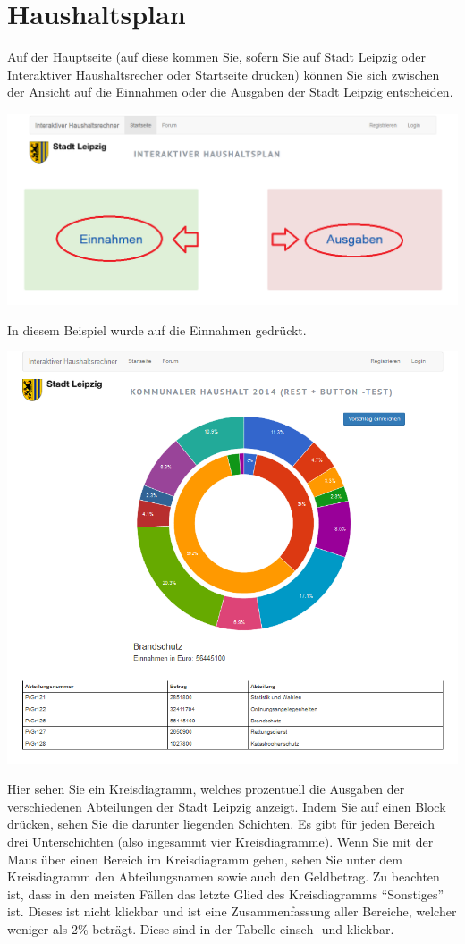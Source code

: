 \documentclass[a4paper,11pt,twoside]{article}
\begin{document}
\section{Haushaltsplan}
Auf der Hauptseite (auf diese kommen Sie, sofern Sie auf Stadt Leipzig oder
Interaktiver Haushaltsrecher oder Startseite dr\"ucken) k\"onnen Sie sich
zwischen der Ansicht auf die Einnahmen oder die Ausgaben der Stadt Leipzig
entscheiden.
\begin{center}
  \includegraphics[width=\textwidth]{Bilder/einAus.png}
\end{center}
In diesem Beispiel wurde auf die Einnahmen gedr\"uckt.

\begin{center}
  \includegraphics[width=\textwidth]{Bilder/piechart.png}
\end{center}
Hier sehen Sie ein Kreisdiagramm, welches prozentuell die Ausgaben der
verschiedenen Abteilungen der Stadt Leipzig anzeigt.  Indem Sie auf einen
Block dr\"ucken, sehen Sie die darunter liegenden Schichten. Es gibt f\"ur
jeden Bereich drei Unterschichten (also ingesammt vier Kreisdiagramme). Wenn
Sie mit der Maus \"uber einen Bereich im Kreisdiagramm gehen, sehen Sie unter
dem Kreisdiagramm den Abteilungsnamen sowie auch den Geldbetrag. Zu beachten
ist, dass in den meisten F\"allen das letzte Glied des Kreisdiagramms
"`Sonstiges"' ist. Dieses ist nicht klickbar und ist eine Zusammenfassung
aller Bereiche, welcher weniger als 2\% betr\"agt. Diese sind in der Tabelle
einseh- und klickbar.
\end{document}

